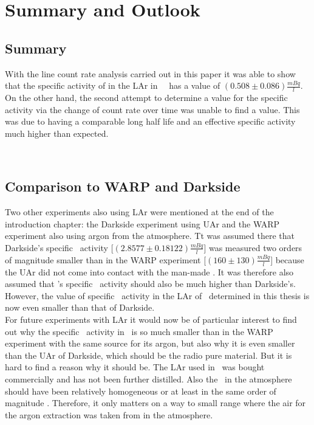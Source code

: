 \documentclass[encoding=utf8,british]{tumphthesis}
\begin{document}
\fi



\chapter{Summary and Outlook}
\label{sec:ConcAndOutlook}
\section{Summary}
With the line count rate analysis carried out in this paper it was able to show that the specific activity of  in the LAr in \gerda\ \PII\ has a value of $(0.508\pm0.086) \frac{\unit{mBq}}{\unit{l}}$. 
On the other hand, the second attempt to determine a value for the specific activity via the change of count rate over time was unable to find a value.
This was due to  having a comparable long half life and an effective specific activity much higher than expected.

\\
\section{Comparison to WARP and Darkside}

Two other experiments also using LAr were mentioned at the end of the introduction chapter: the Darkside experiment using UAr and the WARP experiment also using argon from the atmosphere.
Tt was assumed there that Darkside's specific \Kr\ activity [$(2.8577 \pm 0.18122) \frac{\unit{mBq}}{\unit{l}}$] was measured two orders of magnitude smaller than in the WARP experiment [$(160\pm130)\frac{\unit{mBq}}{\unit{l}}$] because the UAr did not come into contact with the man-made \Kr.
It was therefore also assumed that \gerda's specific \Kr\ activity should also be much higher than Darkside's.
However, the value of specific \Kr\ activity in the LAr of \gerda\ determined in this thesis is now even smaller than that of Darkside.
\\

For future experiments with LAr it would now be of particular interest to find out why the specific \Kr\ activity in \gerda\ is so much smaller than in the WARP experiment with the same source for its argon, but also why it is even smaller than the UAr of Darkside, which should be the radio pure material.
But it is hard to find a reason why it should be.
The LAr used in \gerda\ was bought commercially and has not been further distilled.
Also the \Kr\ in the atmosphere should have been relatively homogeneous or at least in the same order of magnitude \cite{j._jacob_atmospheric_1987}.
Therefore, it only matters on a way to small range where the air for the argon extraction was taken from in the atmosphere.
\\
\end{document}
